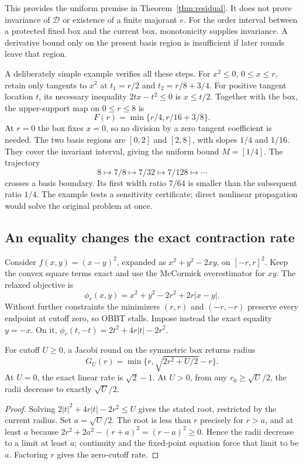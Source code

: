 This provides the uniform premise in Theorem~\ref{thm:residual}. It
does not prove invariance of $\mathcal D$ or existence of a finite
majorant $e$. For the order interval between a protected fixed box and
the current box, monotonicity supplies invariance. A derivative bound
only on the present basis region is insufficient if later rounds leave
that region.

A deliberately simple example verifies all these steps. For $x^2\le0$,
$0\le x\le r$, retain only tangents to $x^2$ at
$t_1=r/2$ and $t_2=r/8+3/4$. For positive tangent location $t$, its
necessary inequality $2tx-t^2\le0$ is $x\le t/2$. Together with the
box, the upper-support map on $0\le r\le8$ is
\begin{equation}\label{eq:switch-map}
 F(r)=\min\{r/4,r/16+3/8\}.
\end{equation}
At $r=0$ the box fixes $x=0$, so no division by a zero tangent
coefficient is needed. The two basis regions are $[0,2]$ and $[2,8]$,
with slopes $1/4$ and $1/16$. They cover the invariant interval, giving
the uniform bound $M=[1/4]$. The trajectory
\[
 8\longmapsto7/8\longmapsto7/32\longmapsto7/128\longmapsto\cdots
\]
crosses a basis boundary. Its first width ratio $7/64$ is smaller than
the subsequent ratio $1/4$. The example tests a sensitivity certificate;
direct nonlinear propagation would solve the original problem at once.

\subsection{An equality changes the exact contraction rate}

Consider $f(x,y)=(x-y)^2$, expanded as $x^2+y^2-2xy$, on $[-r,r]^2$.
Keep the convex square terms exact and use the McCormick overestimator
for $xy$. The relaxed objective is
\[
 \phi_r(x,y)=x^2+y^2-2r^2+2r|x-y|.
\]
Without further constraints the minimizers $(r,r)$ and $(-r,-r)$
preserve every endpoint at cutoff zero, so OBBT stalls. Impose instead
the exact equality $y=-x$. On it,
$\phi_r(t,-t)=2t^2+4r|t|-2r^2$.

\begin{proposition}\label{prop:equality}
For cutoff $U\ge0$, a Jacobi round on the symmetric box returns radius
\[
 G_U(r)=\min\{r,\sqrt{2r^2+U/2}-r\}.
\]
At $U=0$, the exact linear rate is $\sqrt2-1$. At $U>0$, from any
$r_0\ge\sqrt U/2$, the radii decrease to exactly $\sqrt U/2$.
\end{proposition}
\begin{proof}
Solving $2|t|^2+4r|t|-2r^2\le U$ gives the stated root, restricted
by the current radius. Set $a=\sqrt U/2$. The root is less than $r$
precisely for $r>a$, and at least $a$ because
$2r^2+2a^2-(r+a)^2=(r-a)^2\ge0$. Hence the radii decrease to a
limit at least $a$; continuity and the fixed-point equation force that
limit to be $a$. Factoring $r$ gives the zero-cutoff rate.
\end{proof}

